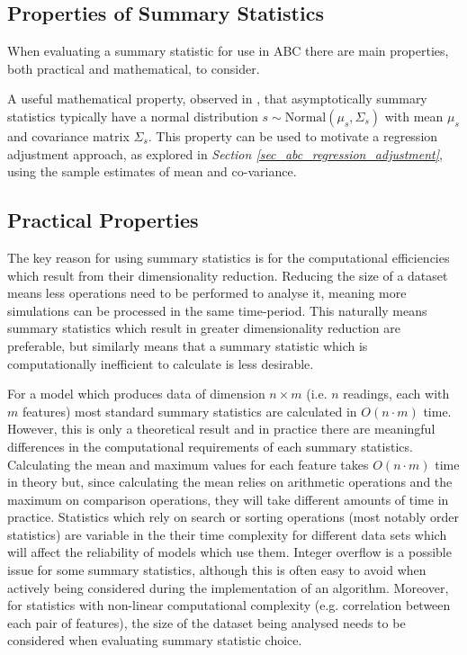 \documentclass[11pt,a4paper]{article}
\theoremstyle{break}
\begin{document}
\subsection{Properties of Summary Statistics}\label{sec_properties_of_summary_statistics}

  \par When evaluating a summary statistic for use in ABC there are main properties, both practical and mathematical, to consider.

  \par A useful mathematical property, observed in \cite[]{statistical_inference_for_noisy_nonlinear_ecological_dynamic_systems}, that asymptotically summary statistics typically have a normal distribution $s\sim\text{Normal}(\mu_s,\Sigma_s)$ with mean $\mu_s$ and covariance matrix $\Sigma_s$. This property can be used to motivate a regression adjustment approach, as explored in \textit{Section \ref{sec_abc_regression_adjustment}}, using the sample estimates of mean and co-variance.

\subsection*{Practical Properties}

  \par The key reason for using summary statistics is for the computational efficiencies which result from their dimensionality reduction. Reducing the size of a dataset means less operations need to be performed to analyse it, meaning more simulations can be processed in the same time-period. This naturally means summary statistics which result in greater dimensionality reduction are preferable, but similarly means that a summary statistic which is computationally inefficient to calculate is less desirable.

  \par For a model which produces data of dimension $n\times m$ (i.e. $n$ readings, each with $m$ features) most standard summary statistics are calculated in $O(n\cdot m)$  time. However, this is only a theoretical result and in practice there are meaningful differences in the computational requirements of each summary statistics. Calculating the mean and maximum values for each feature takes $O(n\cdot m)$ time in theory but, since calculating the mean relies on arithmetic operations and the maximum on comparison operations, they will take different amounts of time in practice. Statistics which rely on search or sorting operations (most notably order statistics) are variable in the their time complexity for different data sets which will affect the reliability of models which use them. Integer overflow is a possible issue for some summary statistics, although this is often easy to avoid when actively being considered during the implementation of an algorithm. Moreover, for statistics with non-linear computational complexity (e.g. correlation between each pair of features), the size of the dataset being analysed needs to be considered when evaluating summary statistic choice.
\end{document}
